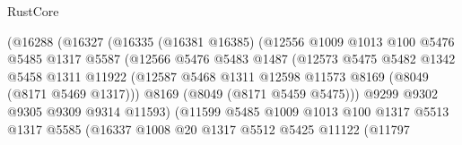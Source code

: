 \begin{lexlean}{RustCore}
\begin{coremodule}
                              (@16288
                                (@16327
                                  (@16335
                                    (@16381 @16385)
                                    (@12556
                                      @1009
                                      @1013
                                      @100
                                      @5476
                                      @5485
                                      @1317
                                      @5587
                                      (@12566
                                        @5476
                                        @5483
                                        @1487
                                        (@12573
                                          @5475
                                          @5482
                                          @1342
                                          @5458
                                          @1311
                                          @11922
                                          (@12587
                                            @5468
                                            @1311
                                            @12598
                                            @11573
                                            @8169
                                            (@8049 (@8171 @5469 @1317)))
                                          @8169
                                          (@8049 (@8171 @5459 @5475)))
                                        @9299
                                        @9302
                                        @9305
                                        @9309
                                        @9314
                                        @11593)
                                      (@11599
                                        @5485
                                        @1009
                                        @1013
                                        @100
                                        @1317
                                        @5513
                                        @1317
                                        @5585
                                        (@16337
                                          @1008
                                          @20
                                          @1317
                                          @5512
                                          @5425
                                          @11122
                                          (@11797

\end{coremodule}
\end{lexlean}
